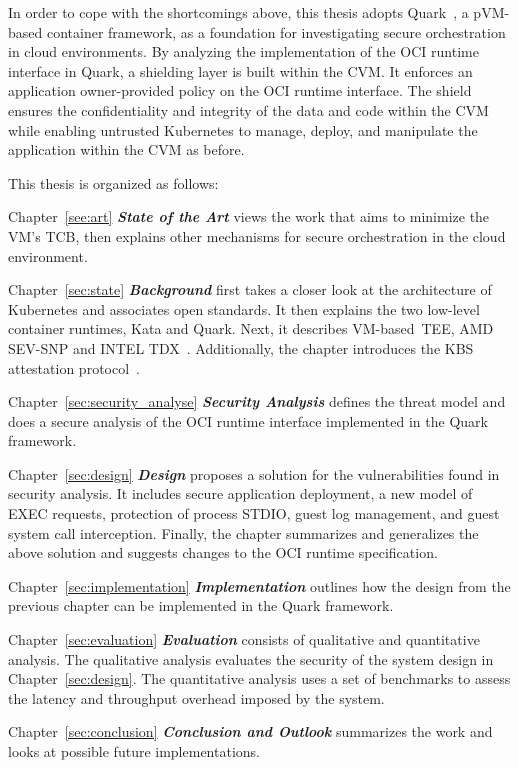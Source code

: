 In order to cope with the shortcomings above, this thesis adopts Quark~\cite*{quark}, a \acrshort{pVM}-based container framework, as a foundation for investigating secure orchestration in cloud environments. By analyzing the implementation of the OCI runtime interface in Quark, 
a shielding layer is built within the \acrshort{CVM}. It enforces an application owner-provided policy on the OCI runtime interface. The shield ensures the confidentiality and integrity of the data and code within the \acrshort{CVM} while enabling untrusted Kubernetes\cite*{k8s} to manage, deploy, 
and manipulate the application within the \acrshort{CVM} as before.
 
This thesis is organized as follows:

\begin{hangparas}{.25in}{1} 

Chapter~\ref{see:art} \textit{\textbf{State of the Art}} views the work that aims to minimize the VM's TCB, then explains other mechanisms for secure orchestration in the cloud environment. 

Chapter~\ref{sec:state} \textit{\textbf{Background}} first takes a closer look at the architecture of Kubernetes\cite*{k8s} and associates open standards. It then explains the two low-level container runtimes, Kata\cite*{Kata-Containers} and Quark\cite*{quark}. Next, it describes 
VM-based~\acrshort{TEE}, AMD SEV-SNP\cite*{SEV_SNP_white_book} and INTEL TDX~\cite*{Intel_tdx_whitepaper}. Additionally, the chapter introduces the KBS attestation protocol~\cite*{kbs_Attestation_protocol}.

Chapter~\ref{sec:security_analyse} \textit{\textbf{Security Analysis}} defines the threat model and does a secure analysis of the OCI runtime interface implemented in the Quark framework.

Chapter~\ref{sec:design} \textit{\textbf{Design}} proposes a solution for the vulnerabilities found in security analysis. It includes secure application deployment, a new model of EXEC requests, protection of process STDIO, guest log management, and guest system call interception. Finally, the chapter summarizes and generalizes the above solution and suggests changes to the OCI runtime specification.

Chapter~\ref{sec:implementation} \textit{\textbf{Implementation}} outlines how the design from the previous chapter can be implemented in the Quark framework.

Chapter~\ref{sec:evaluation} \textit{\textbf{Evaluation}} consists of qualitative and quantitative analysis. The qualitative analysis evaluates the security of the system design in Chapter~\ref{sec:design}. The quantitative analysis uses a set of benchmarks to assess the latency and throughput 
overhead imposed by the system.

Chapter~\ref{sec:conclusion} \textit{\textbf{Conclusion and Outlook}} summarizes the work and looks at possible future implementations.

\end{hangparas}

\cleardoublepage

